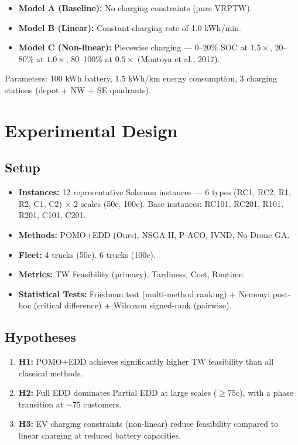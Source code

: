 \documentclass[11pt,a4paper]{article}
\begin{document}
\begin{itemize}[nosep]
    \item \textbf{Model A (Baseline):} No charging constraints (pure VRPTW).
    \item \textbf{Model B (Linear):} Constant charging rate of 1.0 kWh/min.
    \item \textbf{Model C (Non-linear):} Piecewise charging — 0--20\% SOC at $1.5\times$, 20--80\% at $1.0\times$, 80--100\% at $0.5\times$ (Montoya et al., 2017).
\end{itemize}

Parameters: 100 kWh battery, 1.5 kWh/km energy consumption, 3 charging stations
(depot + NW + SE quadrants).

\section{Experimental Design}

\subsection{Setup}
\begin{itemize}[nosep]
    \item \textbf{Instances:} 12 representative Solomon instances — 6 types (RC1, RC2, R1, R2, C1, C2) × 2 scales (50c, 100c). Base instances: RC101, RC201, R101, R201, C101, C201.
    \item \textbf{Methods:} POMO+EDD (Ours), NSGA-II, P-ACO, IVND, No-Drone GA.
    \item \textbf{Fleet:} 4 trucks (50c), 6 trucks (100c).
    \item \textbf{Metrics:} TW Feasibility (primary), Tardiness, Cost, Runtime.
    \item \textbf{Statistical Tests:} Friedman test (multi-method ranking) + Nemenyi post-hoc (critical difference) + Wilcoxon signed-rank (pairwise).
\end{itemize}

\subsection{Hypotheses}
\begin{enumerate}[nosep]
    \item \textbf{H1:} POMO+EDD achieves significantly higher TW feasibility than all classical methods.
    \item \textbf{H2:} Full EDD dominates Partial EDD at large scales ($\geq$75c), with a phase transition at $\sim$75 customers.
    \item \textbf{H3:} EV charging constraints (non-linear) reduce feasibility compared to linear charging at reduced battery capacities.
\end{enumerate}
\end{document}
